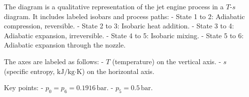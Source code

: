 The diagram is a qualitative representation of the jet engine process in a \( T \)-\( s \) diagram. It includes labeled isobars and process paths:  
- State 1 to 2: Adiabatic compression, reversible.  
- State 2 to 3: Isobaric heat addition.  
- State 3 to 4: Adiabatic expansion, irreversible.  
- State 4 to 5: Isobaric mixing.  
- State 5 to 6: Adiabatic expansion through the nozzle.  

The axes are labeled as follows:  
- \( T \) (temperature) on the vertical axis.  
- \( s \) (specific entropy, \( \text{kJ}/\text{kg·K} \)) on the horizontal axis.  

Key points:  
- \( p_0 = p_6 = 0.1916 \, \text{bar} \).  
- \( p_5 = 0.5 \, \text{bar} \).